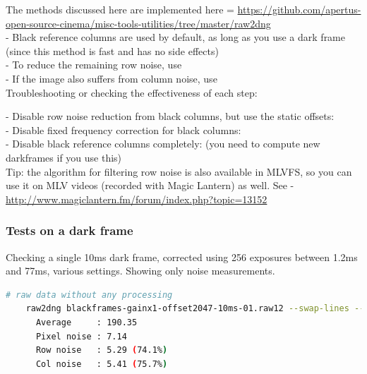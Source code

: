 The methods discussed here are implemented here = \href{https://github.com/apertus-open-source-cinema/misc-tools-utilities/tree/master/raw2dng}{https://github.com/apertus-open-source-cinema/misc-tools-utilities/tree/master/raw2dng} \\

- Black reference columns are used by default, as long as you use a dark frame (since this method is fast and has no side effects)\\
- To reduce the remaining row noise, use \\
- If the image also suffers from column noise, use  \\

Troubleshooting or checking the effectiveness of each step:

- Disable row noise reduction from black columns, but use the static offsets: \\
- Disable fixed frequency correction for black columns: \\
- Disable black reference columns completely:  (you need to compute new darkframes if you use this)\\ 

Tip: the algorithm for filtering row noise is also available in MLVFS, so you can use it on MLV videos (recorded with Magic Lantern) as well. See - \href{http://www.magiclantern.fm/forum/index.php?topic=13152}{http://www.magiclantern.fm/forum/index.php?topic=13152}





\subsubsection{Tests on a dark frame}

Checking a single 10ms dark frame, corrected using 256 exposures between 1.2ms and 77ms, various settings. Showing only noise measurements.

\begin{lstlisting}[language=bash,morekeywords=$,keywordstyle=\bfseries,frame=none,xleftmargin=.25in,belowskip=2em, aboveskip=2em]
    # raw data without any processing
    raw2dng blackframes-gainx1-offset2047-10ms-01.raw12 --swap-lines --no-darkframe --check-darkframe
      Average     : 190.35
      Pixel noise : 7.14
      Row noise   : 5.29 (74.1%)
      Col noise   : 5.41 (75.7%)
\end{lstlisting}

